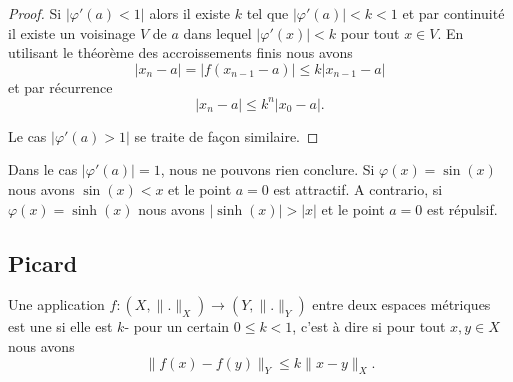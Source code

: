 \begin{proof}
    Si \( | \varphi'(a)<1 |\) alors il existe \( k\) tel que \( | \varphi'(a) |<k<1\) et par continuité il existe un voisinage \( V\) de \( a\) dans lequel \( | \varphi'(x) |<k\) pour tout \( x\in V\). En utilisant le théorème des accroissements finis nous avons
    \begin{equation}
        | x_n-a |=\big| f(x_{n-1}-a) \big|\leq k| x_{n-1}-a |
    \end{equation}
    et par récurrence
    \begin{equation}
        | x_n-a |\leq k^n| x_0-a |.
    \end{equation}

    Le cas \( | \varphi'(a)>1 |\) se traite de façon similaire.
\end{proof}

\begin{remark}
    Dans le cas \(| \varphi'(a) |=1\), nous ne pouvons rien conclure. Si \( \varphi(x)=\sin(x)\) nous avons \( \sin(x)<x\) et le point \( a=0\) est attractif. A contrario, si \( \varphi(x)=\sinh(x)\) nous avons \( |\sinh(x)|>|x|\) et le point \( a=0\) est répulsif.
\end{remark}

\subsection{Picard}

\begin{definition}      \label{DEFooRSLCooAsWisu}
    Une application \( f\colon (X,\| . \|_X)\to (Y,\| . \|_Y)\) entre deux espaces métriques est une  si elle est \( k\)- pour un certain \( 0\leq k<1\), c'est à dire si pour tout \( x,y\in X\) nous avons
    \begin{equation}
        \| f(x)-f(y) \|_Y\leq k\| x-y \|_{X}.
    \end{equation}
\end{definition}


